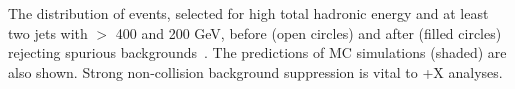 The \MET distribution of events, selected for high total hadronic energy and at least two jets with \pt{} $>$ 400 and 200 GeV, before (open circles) and after (filled circles) rejecting spurious \MET backgrounds~\cite{CMS-PAS-JME-16-004}. The predictions of MC simulations (shaded) are also shown.
Strong non-collision background suppression is vital to \MET+X analyses.